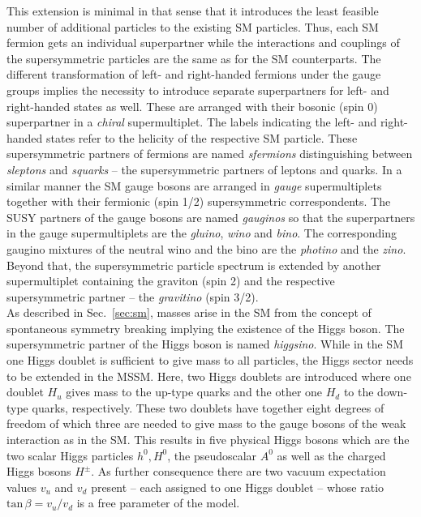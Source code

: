 This extension is minimal in that sense that it introduces the least feasible number of additional particles to the existing SM particles. Thus, each SM fermion gets an individual superpartner while the interactions and couplings of the supersymmetric particles are the same as for the SM counterparts. The different transformation of left- and right-handed fermions under the gauge groups implies the necessity to introduce separate superpartners for left- and right-handed states as well. These are arranged with their bosonic (spin 0) superpartner in a \textit{chiral} supermultiplet. The labels indicating the left- and right-handed states refer to the helicity of the respective SM particle. These supersymmetric partners of fermions are named \textit{sfermions} distinguishing between \textit{sleptons} and \textit{squarks} -- the supersymmetric partners of leptons and quarks. In a similar manner the SM gauge bosons are arranged in \textit{gauge} supermultiplets together with their fermionic (spin 1/2) supersymmetric correspondents. The SUSY partners of the gauge bosons are named \textit{gauginos} so that the superpartners in the gauge supermultiplets are the \textit{gluino}, \textit{wino} and \textit{bino}. The corresponding gaugino mixtures of the neutral wino and the bino are the \textit{photino} and the \textit{zino}. Beyond that, the supersymmetric particle spectrum is extended by another supermultiplet containing the graviton (spin 2) and the respective supersymmetric partner -- the \textit{gravitino} (spin 3/2). \\
As described in Sec.~\ref{sec:sm}, masses arise in the SM from the concept of spontaneous symmetry breaking implying the existence of the Higgs boson. The supersymmetric partner of the Higgs boson is named \textit{higgsino}. While in the SM one Higgs doublet is sufficient to give mass to all particles, the Higgs sector needs to be extended in the MSSM. Here, two Higgs doublets are introduced where one doublet $H_u$ gives mass to the up-type quarks and the other one $H_d$ to the down-type quarks, respectively. These two doublets have together eight degrees of freedom of which three are needed to give mass to the gauge bosons of the weak interaction as in the SM. This results in five physical Higgs bosons which are the two scalar Higgs particles $h^0, H^0$, the pseudoscalar $A^0$ as well as the charged Higgs bosons $H^{\pm}$. As further consequence there are two vacuum expectation values $v_u$ and $v_d$ present -- each assigned to one Higgs doublet -- whose ratio $\mathrm{tan} \, \beta = v_u/v_d$ is a free parameter of the model. \\
